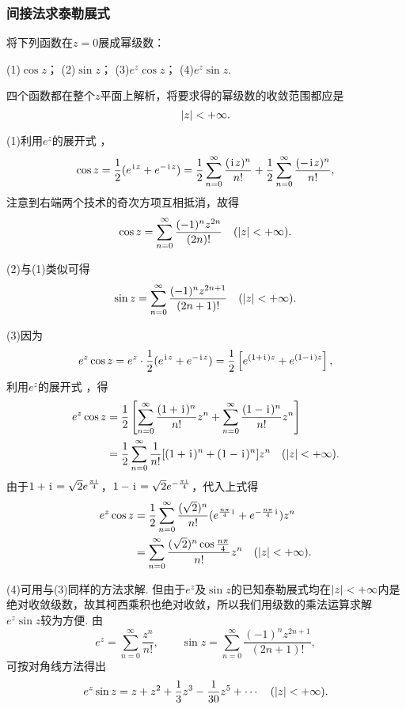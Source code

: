 \subsubsection{间接法求泰勒展式}
\begin{example}
将下列函数在\(z = 0\)展成幂级数：

(1)\(\cos z\)； \hfill (2)\(\sin z\)； \hfill (3)\(e^z \cos z\)； \hfill (4)\(e^z \sin z\).
\begin{solution}
四个函数都在整个\(z\)平面上解析，将要求得的幂级数的收敛范围都应是\[
\abs{z}<+\infty.
\]

(1)利用\(e^z\)的展开式  ，\[
\cos z = \frac{1}{2} (e^{\kern1pt\mathrm{i}\kern1pt z} + e^{-\kern1pt\mathrm{i}\kern1pt z})
= \frac{1}{2} \sum\limits_{n=0}^{\infty} \frac{(\kern1pt\mathrm{i}\kern1pt z)^n}{n!} + \frac{1}{2} \sum\limits_{n=0}^{\infty} \frac{(-\kern1pt\mathrm{i}\kern1pt z)^n}{n!},
\]注意到右端两个技术的奇次方项互相抵消，故得\begin{equation}\label{equation:解析函数的级数表示.余弦函数的泰勒展式}
\cos z = \sum\limits_{n=0}^{\infty} \frac{(-1)^n z^{2n}}{(2n)!} \quad(\abs{z}<+\infty).
\end{equation}

(2)与(1)类似可得\begin{equation}\label{equation:解析函数的级数表示.正弦函数的泰勒展式}
\sin z = \sum\limits_{n=0}^{\infty} \frac{(-1)^n z^{2n+1}}{(2n+1)!} \quad(\abs{z}<+\infty).
\end{equation}

(3)因为\[
e^z \cos z = e^z \cdot \frac{1}{2} (e^{\kern1pt\mathrm{i}\kern1pt z} + e^{-\kern1pt\mathrm{i}\kern1pt z})
= \frac{1}{2} \left[e^{(1+\kern1pt\mathrm{i}\kern1pt)z} + e^{(1-\kern1pt\mathrm{i}\kern1pt)z}\right],
\]利用\(e^z\)的展开式  ，得\begin{align*}
e^z \cos z
&= \frac{1}{2} \left[
\sum\limits_{n=0}^{\infty} \frac{(1+\kern1pt\mathrm{i}\kern1pt)^n}{n!} z^n
+ \sum\limits_{n=0}^{\infty} \frac{(1-\kern1pt\mathrm{i}\kern1pt)^n}{n!} z^n
\right] \\
&= \frac{1}{2} \sum\limits_{n=0}^{\infty} \frac{1}{n!} [(1+\kern1pt\mathrm{i}\kern1pt)^n+(1-\kern1pt\mathrm{i}\kern1pt)^n] z^n
\quad(\abs{z}<+\infty).
\end{align*}
由于\(1+\kern1pt\mathrm{i}\kern1pt=\sqrt{2} e^{\frac{\pi\kern1pt\mathrm{i}\kern1pt}{4}}\)，\(1-\kern1pt\mathrm{i}\kern1pt=\sqrt{2} e^{-\frac{\pi\kern1pt\mathrm{i}\kern1pt}{4}}\)，代入上式得\begin{equation}
\begin{split}
e^z \cos z
&= \frac{1}{2} \sum\limits_{n=0}^{\infty} \frac{(\sqrt{2})^n}{n!} (e^{\frac{n\pi}{4}\kern1pt\mathrm{i}\kern1pt}+e^{-\frac{n\pi}{4}\kern1pt\mathrm{i}\kern1pt}) z^n \\
&= \sum\limits_{n=0}^{\infty} \frac{(\sqrt{2})^n \cos\frac{n\pi}{4}}{n!} z^n
\quad(\abs{z}<+\infty).
\end{split}
\end{equation}

(4)可用与(3)同样的方法求解.
但由于\(e^z\)及\(\sin z\)的已知泰勒展式均在\(\abs{z}<+\infty\)内是绝对收敛级数，故其柯西乘积也绝对收敛，所以我们用级数的乘法运算求解\(e^z \sin z\)较为方便.
由\[
e^z = \sum\limits_{n=0}^{\infty} \frac{z^n}{n!},
\qquad
\sin z = \sum\limits_{n=0}^{\infty} \frac{(-1)^n z^{2n+1}}{(2n+1)!},
\]可按对角线方法得出\[
e^z \sin z
= z + z^2 + \frac{1}{3} z^3 - \frac{1}{30} z^5 + \dotsb
\quad(\abs{z}<+\infty).
\]
\end{solution}
\end{example}

